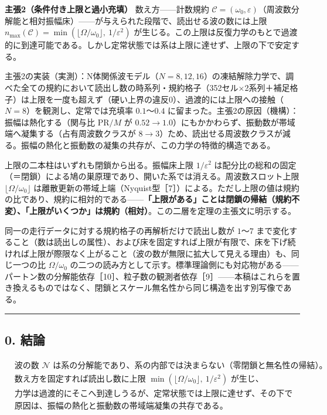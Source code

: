 \documentclass[
  a4paper,
]{ltjsarticle}
\begin{document}
\textbf{主張2（条件付き上限と過小充填）} 数え方------計数規約
\(\mathcal C=(\omega_0,\varepsilon)\)（周波数分解能と相対振幅床）------が与えられた段階で、読出せる波の数には上限
\(n_{\max}(\mathcal C)=\min(\lfloor\Omega/\omega_0\rfloor,\ 1/\varepsilon^2)\)
が生じる。この上限は反復力学のもとで過渡的に到達可能である。しかし定常状態では系は上限に達せず、上限の下で安定する。

主張2の実装（実測）：N体関係波モデル（\(N=8,12,16\)）の凍結解除力学で、調べた全ての規約において読出し数の時系列・規約格子（352セル×2系列＋補足格子）は上限を一度も超えず（硬い上界の違反0）、過渡的には上限への接触（\(N=8\)）を観測し、定常では充填率
\(0.1\)〜\(0.4\) に留まった。主張2の原因（機構）：振幅は熱化する（関与比
\(\mathrm{PR}/M\) が
\(0.52\to1.0\)）にもかかわらず、振動数が帯域端へ凝集する（占有周波数クラスが
\(8\to3\)）ため、読出せる周波数クラスが減る。振幅の熱化と振動数の凝集の共存が、この力学の特徴的構造である。

上限の二本柱はいずれも閉鎖から出る。振幅床上限 \(1/\varepsilon^2\)
は配分比の総和の固定（＝閉鎖）による鳩の巣原理であり、開いた系では消える。周波数スロット上限
\(\lfloor\Omega/\omega_0\rfloor\)
は離散更新の帯域上端（Nyquist型［7］）による。ただし上限の値は規約の比であり、規約に相対的である------\textbf{「上限がある」ことは閉鎖の帰結（規約不変）、「上限がいくつか」は規約（相対）}。この二層を定理の主張文に明示する。

同一の走行データに対する規約格子の再解析だけで読出し数が \(1\)〜\(7\)
まで変化すること（数は読出しの属性）、および床を固定すれば上限が有限で、床を下げ続ければ上限が際限なく上がること（波の数が無限に拡大して見える理由）も、同じ一つの比
\(\Omega/\omega_0\)
の二つの読み方として示す。標準理論側にも対応物がある------パートン数の分解能依存［10］、粒子数の観測者依存［9］------本稿はこれらを置き換えるものではなく、閉鎖とスケール無名性から同じ構造を出す別写像である。

\begin{center}\rule{0.5\linewidth}{0.5pt}\end{center}

\subsection{0. 結論}\label{ux7d50ux8ad6}

\[
\boxed{
\begin{aligned}
&\text{波の数 }\mathcal N\text{ は系の分解能であり、系の内部では決まらない（零閉鎖と無名性の帰結）。}\\
&\text{数え方を固定すれば読出し数に上限 }\min(\lfloor\Omega/\omega_0\rfloor,\ 1/\varepsilon^2)\text{ が生じ、}\\
&\text{力学は過渡的にそこへ到達しうるが、定常状態では上限に達せず、その下で安定する。}\\
&\text{原因は、振幅の熱化と振動数の帯域端凝集の共存である。}
\end{aligned}
}
\]
\end{document}
